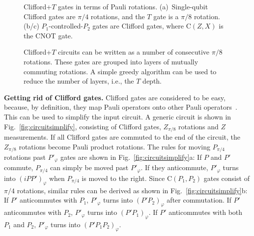 \documentclass[prx,aps,letterpaper,twocolumn,allowfontchageintitle=true,accepted=2019-02-01]{quantumarticle}
\begin{document}
\begin{figure}[b!]
\centering
\def\svgwidth{0.9\linewidth}

\caption{Clifford+$T$ gates in terms of Pauli rotations. (a)~Single-qubit Clifford gates are $\pi/4$ rotations, and the $T$ gate is a $\pi/8$ rotation. (b/c) $P_1$-controlled-$P_2$ gates are Clifford gates, where $\mathrm{C}(Z,X)$ is the CNOT gate.}
\label{fig:gateset}
\end{figure}

\begin{figure}[t!]
\centering
\def\svgwidth{\linewidth}

\caption{Clifford+$T$ circuits can be written as a number of consecutive $\pi/8$ rotations. These gates are grouped into layers of mutually commuting rotations. A simple greedy algorithm can be used to reduce the number of layers, i.e., the $T$ depth.}
\label{fig:tlayers}
\end{figure}

\begin{algorithm}[b!]
 \caption{Algorithm to reduce the $T$ count and $T$ depth.}
\end{algorithm}

\textbf{Getting rid of Clifford gates.} Clifford gates are considered to be easy, because, by definition, they map Pauli operators onto other Pauli operators~\cite{Gottesman1999}. This can be used to simplify the input circuit. A generic circuit is shown in Fig.~\ref{fig:circuitsimplify}, consisting of Clifford gates, $Z_{\pi/8}$ rotations and $Z$ measurements. If all Clifford gates are commuted to the end of the circuit, the $Z_{\pi/8}$ rotations become Pauli product rotations. The rules for moving $P_{\pi/4}$ rotations past $P'_\varphi$ gates are shown in Fig.~\ref{fig:circuitsimplify}a: If $P$ and $P'$ commute, $P_{\pi/4}$ can simply be moved past $P'_\varphi$. If they anticommute, $P'_\varphi$ turns into $(iPP')_\varphi$ when $P_{\pi/4}$ is moved to the right. Since $\mathrm{C}(P_1,P_2)$ gates consist of $\pi/4$ rotations, similar rules can be derived as shown in Fig.~\ref{fig:circuitsimplify}b: If $P'$ anticommutes with $P_1$, $P'_\varphi$ turns into $(P'P_2)_\varphi$ after commutation. If $P'$ anticommutes with $P_2$, $P'_\varphi$ turns into $(P'P_1)_\varphi$. If $P'$ anticommutes with both $P_1$ and $P_2$, $P'_\varphi$ turns into $(P'P_1P_2)_\varphi$.
\end{document}
